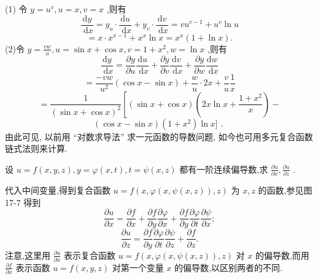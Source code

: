 \begin{solution}

\end{solution}
(1) 令 \(y = {u}^{v},u = x,v = x\) ,则有
\[
\frac{\mathrm{d}y}{\mathrm{\;d}x} = {y}_{u} \cdot  \frac{\mathrm{d}u}{\mathrm{\;d}x} + {y}_{v} \cdot  \frac{\mathrm{d}v}{\mathrm{\;d}x} = v{u}^{v - 1} + {u}^{v}\ln u
\]
\[
= x \cdot  {x}^{x - 1} + {x}^{x}\ln x = {x}^{x}\left( {1 + \ln x}\right) .
\]
(2)令 \(y = \frac{vw}{u},u = \sin x + \cos x,v = 1 + {x}^{2},w = \ln x\) ,则有
\[
\frac{\mathrm{d}y}{\mathrm{\;d}x} = \frac{\partial y}{\partial u}\frac{\mathrm{d}u}{\mathrm{\;d}x} + \frac{\partial y}{\partial v}\frac{\mathrm{d}v}{\mathrm{\;d}x} + \frac{\partial y}{\partial w}\frac{\mathrm{d}w}{\mathrm{\;d}x}
\]
\[
= \frac{-{vw}}{{u}^{2}}\left( {\cos x - \sin x}\right)  + \frac{w}{u} \cdot  {2x} + \frac{v}{u}\frac{1}{x}
\]
\[
= \frac{1}{{\left( \sin x + \cos x\right) }^{2}}\left\lbrack  {\left( {\sin x + \cos x}\right) \left( {{2x}\ln x + \frac{1 + {x}^{2}}{x}}\right)  - }\right.
\]
\[
\left( {\cos x - \sin x}\right) \left( {1 + {x}^{2}}\right) \ln x\rbrack \text{ . }
\]
由此可见, 以前用 “对数求导法” 求一元函数的导数问题, 如今也可用多元复合函数链式法则来计算.

\begin{example}

\end{example}
设 \(u = f\left( {x,y,z}\right) ,y = \varphi \left( {x,t}\right) ,t = \psi \left( {x,z}\right)\) 都有一阶连续偏导数,求 \(\frac{\partial u}{\partial x},\frac{\partial u}{\partial z}\) .

\begin{solution}

\end{solution}
代入中间变量,得到复合函数 \(u = f\left( {x,\varphi \left( {x,\psi \left( {x,z}\right) }\right) ,z}\right)\) 为 \(x,z\) 的函数,参见图 17-7 得到
\[
\frac{\partial u}{\partial x} = \frac{\partial f}{\partial x} + \frac{\partial f}{\partial y}\frac{\partial \varphi }{\partial x} + \frac{\partial f}{\partial y}\frac{\partial \varphi }{\partial t}\frac{\partial \psi }{\partial x};
\]
\[
\frac{\partial u}{\partial z} = \frac{\partial f}{\partial y}\frac{\partial \varphi }{\partial t}\frac{\partial \psi }{\partial z} + \frac{\partial f}{\partial z}.
\]
注意,这里用 \(\frac{\partial u}{\partial x}\) 表示复合函数 \(u = f\left( {x,\varphi \left( {x,\psi \left( {x,z}\right) }\right) ,z}\right)\) 对 \(x\) 的偏导数,而用 \(\frac{\partial f}{\partial x}\) 表示函数 \(u = f\left( {x,y,z}\right)\) 对第一个变量 \(x\) 的偏导数,以区别两者的不同.

